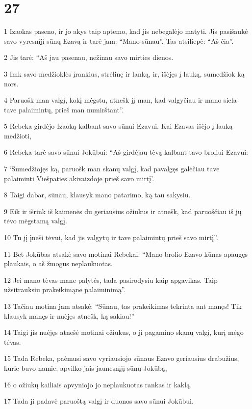 \chapter{27}


\par 1 Izaokas paseno, ir jo akys taip aptemo, kad jis nebegalėjo matyti. Jis pasišaukė savo vyresnįjį sūnų Ezavą ir tarė jam: “Mano sūnau”. Tas atsiliepė: “Aš čia”. 
\par 2 Jis tarė: “Aš jau pasenau, nežinau savo mirties dienos. 
\par 3 Imk savo medžioklės įrankius, strėlinę ir lanką, ir, išėjęs į lauką, sumedžiok ką nors. 
\par 4 Paruošk man valgį, kokį mėgstu, atnešk jį man, kad valgyčiau ir mano siela tave palaimintų, prieš man numirštant”. 
\par 5 Rebeka girdėjo Izaoką kalbant savo sūnui Ezavui. Kai Ezavas išėjo į lauką medžioti, 
\par 6 Rebeka tarė savo sūnui Jokūbui: “Aš girdėjau tėvą kalbant tavo broliui Ezavui: 
\par 7 ‘Sumedžiojęs ką, paruošk man skanų valgį, kad pavalgęs galėčiau tave palaiminti Viešpaties akivaizdoje prieš savo mirtį’. 
\par 8 Taigi dabar, sūnau, klausyk mano patarimo, ką tau sakysiu. 
\par 9 Eik ir išrink iš kaimenės du geriausius ožiukus ir atnešk, kad paruoščiau iš jų tėvo mėgstamą valgį. 
\par 10 Tu jį įneši tėvui, kad jis valgytų ir tave palaimintų prieš savo mirtį”. 
\par 11 Bet Jokūbas atsakė savo motinai Rebekai: “Mano brolio Ezavo kūnas apaugęs plaukais, o aš žmogus neplaukuotas. 
\par 12 Jei mano tėvas mane palytės, tada pasirodysiu kaip apgavikas. Taip užsitrauksiu prakeikimą­ne palaiminimą”. 
\par 13 Tačiau motina jam atsakė: “Sūnau, tas prakeikimas tekrinta ant manęs! Tik klausyk manęs ir nuėjęs atnešk, ką sakiau!” 
\par 14 Taigi jis nuėjęs atnešė motinai ožiukus, o ji pagamino skanų valgį, kurį mėgo tėvas. 
\par 15 Tada Rebeka, paėmusi savo vyriausiojo sūnaus Ezavo geriausius drabužius, kurie buvo namie, apvilko jais jaunesnįjį sūnų Jokūbą, 
\par 16 o ožiukų kailiais apvyniojo jo neplaukuotas rankas ir kaklą. 
\par 17 Tada ji padavė paruoštą valgį ir duonos savo sūnui Jokūbui. 
